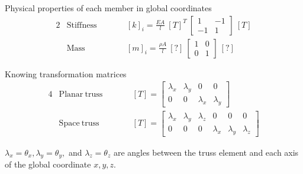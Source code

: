 %

Physical properties of each member in global coordinates
\begin{alignat}{2}
& \mathrm{Stiffness} & \qquad & [k]_i = \frac{EA}{l} \: [T]^T\: \left[ \begin{matrix}1 & -1 \\ -1 & 1 \end{matrix}\right]\:[T] \\
& \mathrm{Mass} & \qquad & [m]_i = \frac{\rho A}{l} \: [?]\:\left[ \begin{matrix}1 & 0 \\ 0 & 1\end{matrix}\right]\:[?]
\end{alignat}

Knowing transformation matrices
\begin{alignat}{4}
& \mathrm{Planar\:truss}  & \qquad &[T] =  
\left[ \begin{matrix} 
\lambda_x & \lambda_y & 0 & 0 \\ 0 & 0 & \lambda_x & \lambda_y 
\end{matrix} \right] \\
& \mathrm{Space\:truss}  & \qquad &[T] =  
\left[ \begin{matrix}
\lambda_x & \lambda_y & \lambda_z & 0 & 0 & 0 \\
0 & 0 & 0 & \lambda_x & \lambda_y & \lambda_z 
\end{matrix}\right]  
\end{alignat}

$\lambda_x=\theta_x, \lambda_y=\theta_y,$ and $ \lambda_z=\theta_z$ are angles between the truss element and each axis of the global coordinate $x, y, z$.

